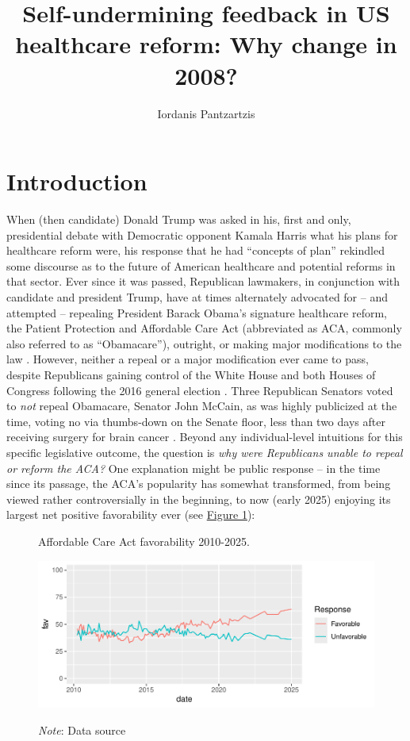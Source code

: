 \documentclass[11pt, xcolor=dvipsnames]{article}
\author[1]{Iordanis Pantzartzis}
\affil[1]{Universität Konstanz, 01/1001158}
\title{Self-undermining feedback in US healthcare reform: Why change in 2008?}
\begin{document}


\restoregeometry

\maketitle

\section*{Introduction}

When (then candidate) Donald Trump was asked in his, first and only, presidential debate with Democratic opponent Kamala Harris what his plans for healthcare reform were, his response that he had \enquote{concepts of plan} \parencite[][]{Trump2024} rekindled some discourse as to the future of American healthcare and potential reforms in that sector. Ever since it was passed, Republican lawmakers, in conjunction with candidate and president Trump, have at times alternately advocated for -- and attempted -- repealing President Barack Obama's signature healthcare reform, the Patient Protection and Affordable Care Act (abbreviated as ACA, commonly also referred to as \enquote{Obamacare}), outright, or making major modifications to the law \parencite[][]{Armour2024}. However, neither a repeal or a major modification ever came to pass, despite Republicans gaining control of the White House and both Houses of Congress following the 2016 general election \parencite[][]{FEC2016}. Three Republican Senators voted to \textit{not} repeal Obamacare, Senator John McCain, as was highly publicized at the time, voting no via thumbs-down on the Senate floor, less than two days after receiving surgery for brain cancer \parencite[][]{Davis2016}. Beyond any individual-level intuitions for this specific legislative outcome, the question is \textit{why were Republicans unable to repeal or reform the ACA?} One explanation might be public response -- in the time since its passage, the ACA's popularity has somewhat transformed, from being viewed rather controversially in the beginning, to now (early 2025) enjoying its largest net positive favorability ever (see \hyperref[fig:aca_fav]{Figure 1}):\\

\begin{figure}[H]
    \caption{Affordable Care Act favorability 2010-2025.}
    \includegraphics[scale=1]{_aca_fav.pdf}
    \label{fig:aca_fav}
    \caption*{\textit{Note}: Data source \textcite[][]{KFF1}}
\end{figure}
\end{document}
